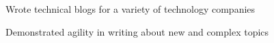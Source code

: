 \item Wrote technical blogs for a variety of technology companies
\item Demonstrated agility in writing about new and complex topics